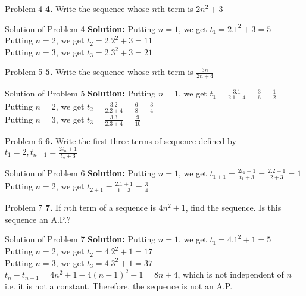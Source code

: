 \documentclass[aspectratio=1610,8pt]{beamer}
\begin{document}
\begin{frame}{Problem 4}
  \textbf{4.} Write the sequence whose $n$th term is $2n^2 + 3$
\end{frame}
\begin{frame}{Solution of Problem 4}
  \textbf{Solution:} Putting $n = 1$, we get $t_1 = 2.1^2 + 3 = 5$\\
  Putting $n = 2$, we get $t_2 = 2.2^2 + 3 = 11$\\
  Putting $n = 3$, we get $t_3 = 2.3^2 + 3 =21$
\end{frame}
\begin{frame}{Problem 5}
  \textbf{5.} Write the sequence whose $n$th term is $\frac{3n}{2n + 4}$
\end{frame}
\begin{frame}{Solution of Problem 5}
  \textbf{Solution:} Putting $n = 1$, we get $t_1 = \frac{3.1}{2.1 + 4} = \frac{3}{6} = \frac{1}{2}$\\
  Putting $n=2$, we get $t_2 = \frac{3.2}{2.2 + 4} = \frac{6}{8} = \frac{3}{4}$\\
  Putting $n=3$, we get $t_3 = \frac{3.3}{2.3 + 4} = \frac{9}{10}$
\end{frame}
\begin{frame}{Problem 6}
  \textbf{6.} Write the first three terms of sequence defined by $t_1 = 2, t_{n + 1} = \frac{2t_n + 1}{t_n + 3}$
\end{frame}
\begin{frame}{Solution of Problem 6}
  \textbf{Solution:} Putting $n=1$, we get $t_{1 + 1} = \frac{2t_1 + 1}{t_1 + 3} = \frac{2.2 + 1}{2 + 3} = 1$\\
  Putting $n=2$, we get $t_{2 + 1} = \frac{2.1 + 1}{1 + 3} = \frac{3}{4}$
\end{frame}
\begin{frame}{Problem 7}
  \textbf{7.} If $n$th term of a sequence is $4n^2 + 1$, find the sequence. Is this sequence an A.P.?
\end{frame}
\begin{frame}{Solution of Problem 7}
  \textbf{Solution:} Putting $n = 1$, we get $t_1 = 4.1^2 + 1 = 5$\\
  Putting $n = 2$, we get $t_2 = 4.2^2 + 1 = 17$\\
  Putting $n = 3$, we get $t_3 = 4.3^2 + 1 = 37$\\

  $t_n - t_{n - 1} = 4n^2 + 1 - 4(n - 1)^2 - 1 = 8n + 4$, which is not
  independent of $n$ i.e. it is not a constant. Therefore, the sequence is not
  an A.P.
\end{frame}
\end{document}
